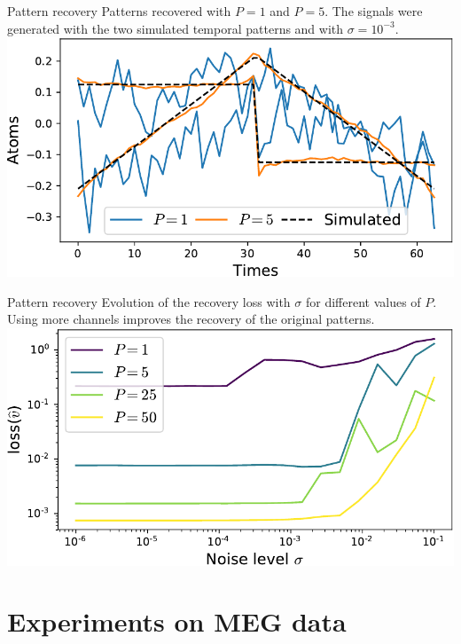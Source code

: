 \documentclass{beamer}
\begin{document}
\begin{frame}{Pattern recovery}
Patterns recovered with $P = 1$ and $P=5$. The signals were generated with the two simulated temporal patterns and with  $\sigma = 10^{-3}$. \\[1em]
\includegraphics[width=\textwidth]{1D_vs_multi_uv_hat_P5.pdf}
\end{frame}
\begin{frame}{Pattern recovery}
Evolution of the recovery loss with $\sigma$ for different values of $P$. Using more channels improves the recovery of the original patterns.\\[1em]
\includegraphics[width=\textwidth]{1D_vs_multi.pdf}
\end{frame}


\section{Experiments on MEG data}
\end{document}
